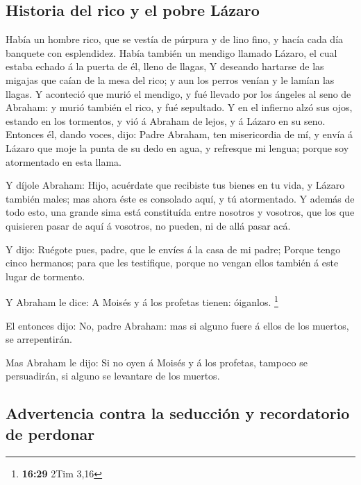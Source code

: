 \hypertarget{historia-del-rico-y-el-pobre-luxe1zaro}{%
\subsection{Historia del rico y el pobre
Lázaro}\label{historia-del-rico-y-el-pobre-luxe1zaro}}

 Había un hombre rico, que se vestía de púrpura y de lino
fino, y hacía cada día banquete con esplendidez.  Había
también un mendigo llamado Lázaro, el cual estaba echado á la puerta de
él, lleno de llagas,  Y deseando hartarse de las migajas
que caían de la mesa del rico; y aun los perros venían y le lamían las
llagas.  Y aconteció que murió el mendigo, y fué llevado
por los ángeles al seno de Abraham: y murió también el rico, y fué
sepultado.  Y en el infierno alzó sus ojos, estando en
los tormentos, y vió á Abraham de lejos, y á Lázaro en su seno.
 Entonces él, dando voces, dijo: Padre Abraham, ten
misericordia de mí, y envía á Lázaro que moje la punta de su dedo en
agua, y refresque mi lengua; porque soy atormentado en esta llama.

 Y díjole Abraham: Hijo, acuérdate que recibiste tus
bienes en tu vida, y Lázaro también males; mas ahora éste es consolado
aquí, y tú atormentado.  Y además de todo esto, una
grande sima está constituída entre nosotros y vosotros, que los que
quisieren pasar de aquí á vosotros, no pueden, ni de allá pasar acá.

 Y dijo: Ruégote pues, padre, que le envíes á la casa de
mi padre;  Porque tengo cinco hermanos; para que les
testifique, porque no vengan ellos también á este lugar de tormento.

 Y Abraham le dice: A Moisés y á los profetas tienen:
óiganlos. \footnote{\textbf{16:29} 2Tim 3,16}

 El entonces dijo: No, padre Abraham: mas si alguno fuere
á ellos de los muertos, se arrepentirán.

 Mas Abraham le dijo: Si no oyen á Moisés y á los
profetas, tampoco se persuadirán, si alguno se levantare de los muertos.

\hypertarget{advertencia-contra-la-seducciuxf3n-y-recordatorio-de-perdonar}{%
\subsection{Advertencia contra la seducción y recordatorio de
perdonar}\label{advertencia-contra-la-seducciuxf3n-y-recordatorio-de-perdonar}}

